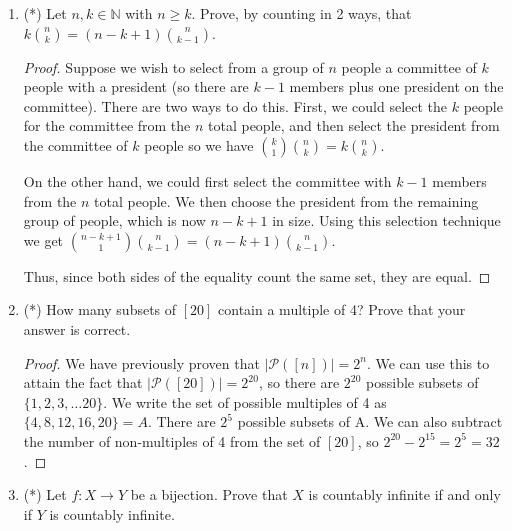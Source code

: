 \documentclass[12pt]{article}
\newcommand{\N}{\mathbb{N}}
\begin{document}
\begin{enumerate}
\item (*) Let $n, k\in \N$ with $n\geq k$. Prove, by counting in 2 ways, that $k{n\choose k} = (n-k+1){n\choose k-1}$.

\begin{proof}
Suppose we wish to select from a group of $n$ people a committee of $k$ people with a president (so there are $k-1$ members plus one president on the committee). There are two ways to do this. First, we could select the $k$ people for the committee from the $n$ total people, and then select the president from the committee of $k$ people so we have ${k \choose 1}{n\choose k} = k{n\choose k}$.

On the other hand, we could first select the committee with $k - 1$ members from the $n$ total people. We then choose the president from the remaining group of people, which is now $n - k + 1$ in size. Using this selection technique we get ${n-k+1 \choose 1}{n\choose k-1} = (n-k+1){n\choose k-1}$. 

Thus, since both sides of the equality count the same set, they are equal. 
\end{proof}

\item (*) How many subsets of $[20]$ contain a multiple of 4? Prove that your answer is correct.

\begin{proof}
We have previously proven that $ | \mathcal{P}([n]) | = 2^n$. We can use this to attain the fact that $| \mathcal{P}([20]) | = 2^{20}$, so there are $2^{20}$ possible subsets of $\{1, 2, 3, \ldots 20\}$. We write the set of possible multiples of 4 as $\{4, 8, 12, 16, 20\}  = A$. There are $2^5$ possible subsets of A. We can also subtract the number of non-multiples of 4 from the set of $[20]$, so $2^{20} - 2^{15} = 2^5 = 32$.
\end{proof}

\item (*) Let $f:X\to Y$ be a bijection. Prove that $X$ is countably infinite if and only if $Y$ is countably infinite.


\end{enumerate}
\end{document}
